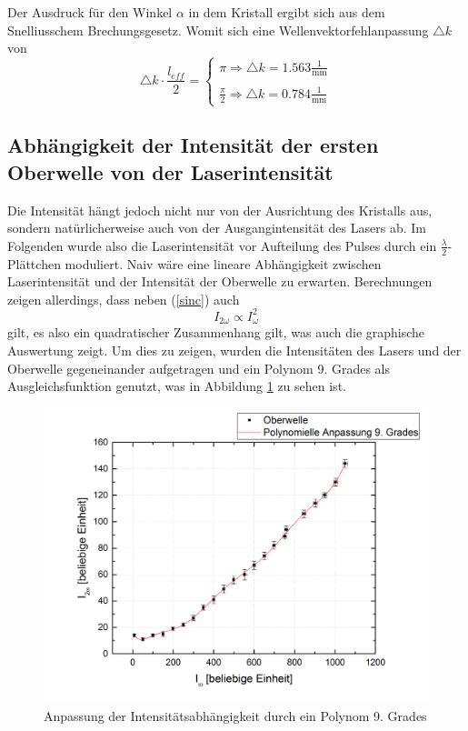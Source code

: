 Der Ausdruck für den Winkel $\alpha$ in dem Kristall ergibt sich aus dem Snelliusschem Brechungsgesetz.\newline
Womit sich eine Wellenvektorfehlanpassung $\triangle k$ von 
\begin{equation}
\triangle k\cdot \frac{l_{eff}}{2}=\left\{\begin{array}{ll} \pi \Longrightarrow \triangle k=1.563\frac{1}{\text{mm}} \\\\
\frac{\pi}{2}\Longrightarrow \triangle k=0.784\frac{1}{\text{mm}}  \end{array}\right.
\end{equation}
\subsection{Abhängigkeit der Intensität der ersten Oberwelle von der Laserintensität}
Die Intensität hängt jedoch nicht nur von der Ausrichtung des Kristalls aus, sondern natürlicherweise auch von der Ausgangintensität des Lasers ab. Im Folgenden wurde also die Laserintensität vor Aufteilung des Pulses durch ein $\frac{\lambda}{2}$-Plättchen moduliert. \newline
Naiv wäre eine lineare Abhängigkeit zwischen Laserintensität und der Intensität der Oberwelle zu erwarten. Berechnungen zeigen allerdings, dass neben (\ref{sinc}) auch
\begin{equation}
I_{2\omega}\propto I_\omega^2
\end{equation}
gilt, es also ein quadratischer Zusammenhang gilt, was auch die graphische Auswertung zeigt. Um dies zu zeigen, wurden die Intensitäten des Lasers und der Oberwelle gegeneinander aufgetragen und ein Polynom 9. Grades als Ausgleichsfunktion genutzt, was in Abbildung \ref{pol9} zu sehen ist.
\begin{figure}[H]
	\begin{center}
		\includegraphics[scale=.5]{Bilder/IntPol9.png}
		\caption{Anpassung der Intensitätsabhängigkeit durch ein Polynom 9. Grades}
		\label{pol9}
	\end{center}
\end{figure}
